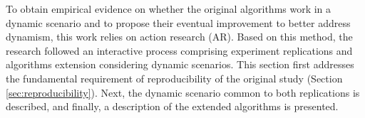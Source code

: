
To obtain empirical evidence on whether the original algorithms work in a dynamic scenario and to propose their eventual improvement to better address dynamism, this work relies on action research (AR)\cite{action_research}. Based on this method, the research followed an interactive process comprising experiment replications and algorithms extension considering dynamic scenarios. This section first addresses the fundamental requirement of reproducibility of the original study (Section \ref{sec:reproducibility}). Next, the dynamic scenario common to both replications is described, and finally, a description of the  extended algorithms is presented. 
